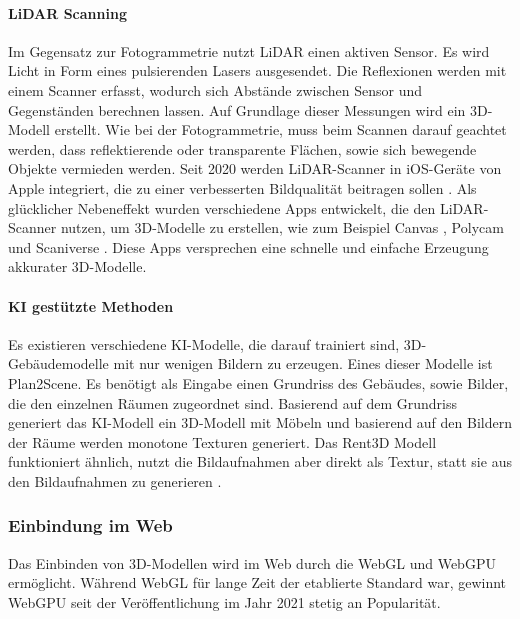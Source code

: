 \paragraph{LiDAR Scanning}
Im Gegensatz zur Fotogrammetrie nutzt \ac{LiDAR} einen aktiven Sensor. Es wird Licht in Form eines pulsierenden Lasers ausgesendet. Die Reflexionen werden mit einem Scanner erfasst, wodurch sich Abstände zwischen Sensor und Gegenständen berechnen lassen. Auf Grundlage dieser Messungen wird ein 3D-Modell erstellt. Wie bei der Fotogrammetrie, muss beim Scannen darauf geachtet werden, dass reflektierende oder transparente Flächen, sowie sich bewegende Objekte vermieden werden. Seit 2020 werden \ac{LiDAR}-Scanner in iOS-Geräte von Apple integriert, die zu einer verbesserten Bildqualität beitragen sollen \cite{Fenstermaker2022}. Als glücklicher Nebeneffekt wurden verschiedene Apps entwickelt, die den \ac{LiDAR}-Scanner nutzen, um 3D-Modelle zu erstellen, wie zum Beispiel Canvas \cite{Canvas2023}, Polycam \cite{Polycam2024} und Scaniverse \cite{Scaniverse2024}. Diese Apps versprechen eine schnelle und einfache Erzeugung akkurater 3D-Modelle.

\paragraph{KI gestützte Methoden}
Es existieren verschiedene \ac{KI}-Modelle, die darauf trainiert sind, 3D-Gebäudemodelle mit nur wenigen Bildern zu erzeugen. Eines dieser Modelle ist Plan2Scene. Es benötigt als Eingabe einen Grundriss des Gebäudes, sowie Bilder, die den einzelnen Räumen zugeordnet sind. Basierend auf dem Grundriss generiert das \ac{KI}-Modell ein 3D-Modell mit Möbeln und basierend auf den Bildern der Räume werden monotone Texturen generiert.\cite[S.~10733]{Plan2Scene2021} Das Rent3D Modell funktioniert ähnlich, nutzt die Bildaufnahmen aber direkt als Textur, statt sie aus den Bildaufnahmen zu generieren \cite[S.~3413]{Rent3D2015}.

\subsubsection{Einbindung im Web}
Das Einbinden von 3D-Modellen wird im Web durch die \ac{WebGL} und WebGPU ermöglicht. Während \ac{WebGL} für lange Zeit der etablierte Standard war, gewinnt WebGPU seit der Veröffentlichung im Jahr 2021 stetig an Popularität.

